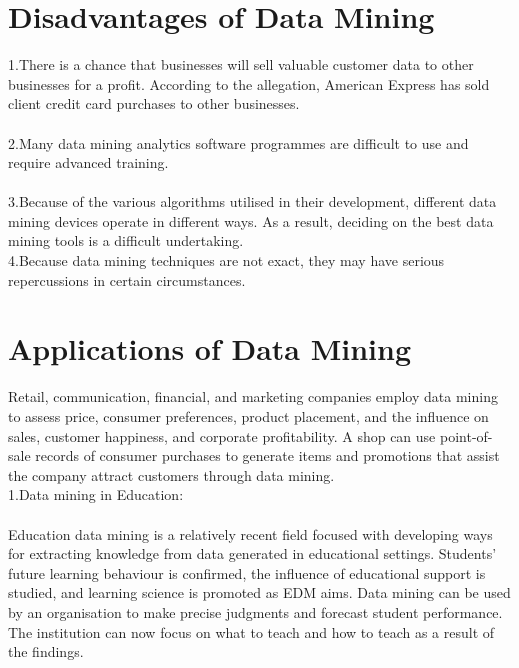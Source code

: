 \documentclass[12pt,letterpaper]{article}
\begin{document}
\section{Disadvantages of Data Mining}
1.There is a chance that businesses will sell valuable customer data to other businesses for a profit. According to the allegation, American Express has sold client credit card purchases to other businesses.\\
\\
2.Many data mining analytics software programmes are difficult to use and require advanced training.\\
\\
3.Because of the various algorithms utilised in their development, different data mining devices operate in different ways. As a result, deciding on the best data mining tools is a difficult undertaking.\\

4.Because data mining techniques are not exact, they may have serious repercussions in certain circumstances.
\section{Applications of Data Mining}
Retail, communication, financial, and marketing companies employ data mining to assess price, consumer preferences, product placement, and the influence on sales, customer happiness, and corporate profitability. A shop can use point-of-sale records of consumer purchases to generate items and promotions that assist the company attract customers through data mining.\\

1.Data mining in Education:\\
\\
Education data mining is a relatively recent field focused with developing ways for extracting knowledge from data generated in educational settings. Students' future learning behaviour is confirmed, the influence of educational support is studied, and learning science is promoted as EDM aims. Data mining can be used by an organisation to make precise judgments and forecast student performance. The institution can now focus on what to teach and how to teach as a result of the findings.\\
\end{document}
